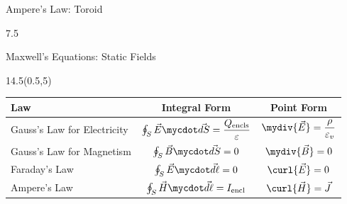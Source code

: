\begin{frame}{Ampere's Law: Toroid}
\begin{textblock}{7.5}
\begin{small}
	\end{small}
\end{textblock}
\end{frame}

\begin{frame}{Maxwell's Equations: Static Fields}
\begin{textblock}{14.5}(0.5,5)
\begin{center}
\renewcommand{\arraystretch}{1.5}
\begin{tabular}{| l | c | c | }
	\hline
	\textbf{Law} 				& \textbf{Integral Form} 				& \textbf{Point Form} \\\hline\hline
	Gauss's Law for Electricity 	
		& $\oint_S \vec{E}\mycdot \vec{dS} = \dfrac{Q_{\text{encls}}}{\varepsilon}$ 	
		& $\mydiv{\vec{E}} = \dfrac{\rho}{\varepsilon_v} $
	\\\hline
	Gauss's Law for Magnetism 	
		& $\oint_S \vec{B} \mycdot \vec{dS} = 0$
		& $\mydiv{\vec{B}}  = 0 $
	\\\hline
	Faraday's Law	
		& $\oint_S \vec{E}\mycdot \vec{d\ell} =  0$
		& $\curl{\vec{E}} = 0 $
	\\\hline
	Ampere's Law
		&$\oint_S \vec{H}\mycdot \vec{d\ell} = I_{\text{encl}} $
		&$\curl{\vec{H}} = \vec{J} $
	\\\hline
\end{tabular}	
\end{center}
\end{textblock}
\end{frame}

